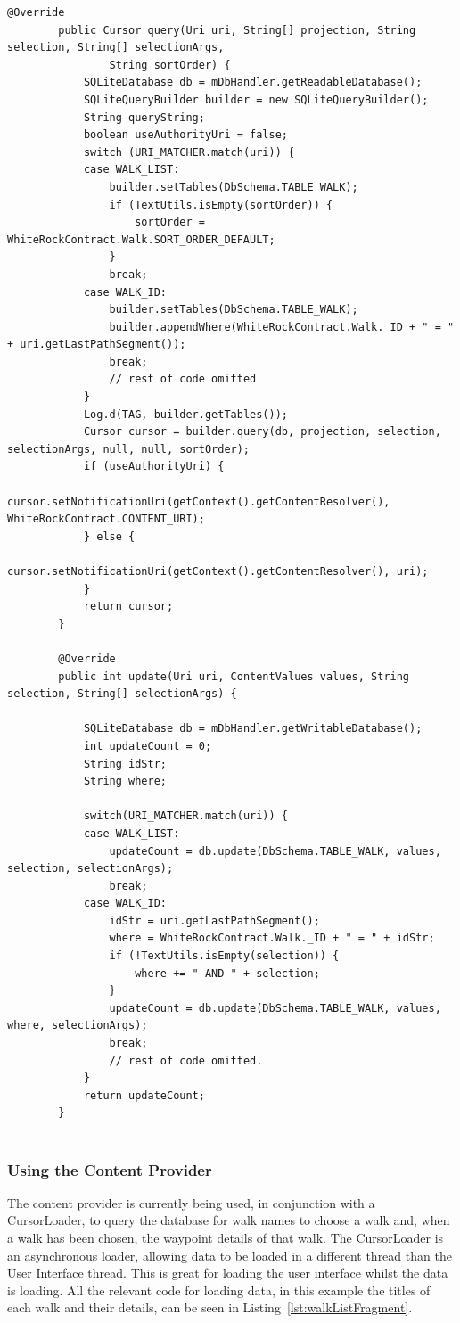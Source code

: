 \documentclass[11pt,a4paper]{article}
\begin{document}
\begin{lstlisting}[captionpos=b, caption=WhiteRockContentProvider Snippet, label=lst:contentprovider, frame=single]
		@Override
		public Cursor query(Uri uri, String[] projection, String selection, String[] selectionArgs,
				String sortOrder) {
			SQLiteDatabase db = mDbHandler.getReadableDatabase();
			SQLiteQueryBuilder builder = new SQLiteQueryBuilder();
			String queryString;
			boolean useAuthorityUri = false;
			switch (URI_MATCHER.match(uri)) {
			case WALK_LIST:
				builder.setTables(DbSchema.TABLE_WALK);
				if (TextUtils.isEmpty(sortOrder)) {
					sortOrder = WhiteRockContract.Walk.SORT_ORDER_DEFAULT;
				}
				break;
			case WALK_ID:
				builder.setTables(DbSchema.TABLE_WALK);
				builder.appendWhere(WhiteRockContract.Walk._ID + " = " + uri.getLastPathSegment());
				break;
				// rest of code omitted
			}
			Log.d(TAG, builder.getTables());
			Cursor cursor = builder.query(db, projection, selection, selectionArgs, null, null, sortOrder);
			if (useAuthorityUri) {
				cursor.setNotificationUri(getContext().getContentResolver(), WhiteRockContract.CONTENT_URI);
			} else {
				cursor.setNotificationUri(getContext().getContentResolver(), uri);
			}
			return cursor;
		}
		
		@Override
		public int update(Uri uri, ContentValues values, String selection, String[] selectionArgs) {
	
			SQLiteDatabase db = mDbHandler.getWritableDatabase();
			int updateCount = 0;
			String idStr;
			String where;
	
			switch(URI_MATCHER.match(uri)) {
			case WALK_LIST:
				updateCount = db.update(DbSchema.TABLE_WALK, values, selection, selectionArgs);
				break;
			case WALK_ID:
				idStr = uri.getLastPathSegment();
				where = WhiteRockContract.Walk._ID + " = " + idStr;
				if (!TextUtils.isEmpty(selection)) {
					where += " AND " + selection;
				}
				updateCount = db.update(DbSchema.TABLE_WALK, values, where, selectionArgs);
				break;
				// rest of code omitted.
			}
			return updateCount;
		}
	
\end{lstlisting}

\subsubsection{Using the Content Provider}
The content provider is currently being used, in conjunction with a CursorLoader, to query the database for walk names to choose a walk and, when a walk has been chosen, the waypoint details of that walk. The CursorLoader is an asynchronous loader, allowing data to be loaded in a different thread than the User Interface thread. This is great for loading the user interface whilst the data is loading. All the relevant code for loading data, in this example the titles of each walk and their details, can be seen in Listing~\ref{lst:walkListFragment}.
\end{document}
